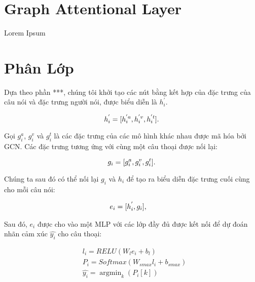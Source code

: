 \section{Graph Attentional Layer}

Lorem Ipsum

\section{Phân Lớp}

Dựa theo phần ***,  chúng tôi khởi tạo các nút bằng kết hợp của đặc trưng của câu nói và đặc trưng người nói, được biểu diễn là $h^{'}_{i}$.


\begin{small}
\begin{equation}
    \centering
    h^{'}_{i} = [h^{'a}_{i}, h^{'v}_{i}, h^{'t}_{i}].
\end{equation}
\end{small}
Gọi $g_{i}^a$, $g_{i}^v$ và $g_{i}^t$ là các đặc trưng của các mô hình khác nhau được mã hóa bởi GCN. Các đặc trưng tương ứng với cùng một câu thoại được nối lại: 

\begin{small}
\begin{equation}
    \centering
    g_{i} = [g_{i}^a, g_{i}^v, g_{i}^t].
\end{equation}
\end{small}
Chúng ta sau đó có thể nối lại $g_{i}$ và $h_{i}$ để tạo ra biểu diễn đặc trưng cuối cùng cho mỗi câu nói: 

\begin{small}
\begin{align}
    \centering
    &e_{i} = [h^{'}_{i}, g_{i}] ,
\end{align}
\end{small}

Sau đó, $e_{i}$  được cho vào một MLP với các lớp đầy đủ được kết nối để dự đoán nhãn cảm xúc $\hat{y_{i}}$ cho câu thoại:

\begin{small}
\begin{equation}
\begin{aligned}
    &l_{i} = RELU(W_{l}e_{i}+b_{l})\\
    &P_{i} = Softmax(W_{smax}l_{i}+b_{smax})\\
    &\hat{y_{i}} = \mathop{\arg\min}_{k} (P_{i}[k])
\end{aligned}
\end{equation}
\end{small}


